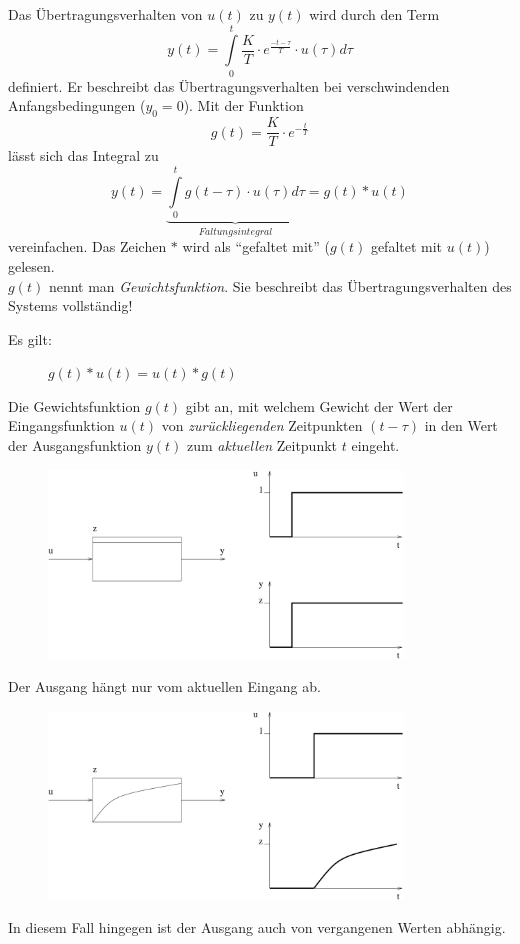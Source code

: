 \message{ !name(Mitschrieb_SysRegel.tex)}\documentclass[12pt,a4paper,ngerman]{scrartcl}
\begin{document}
Das Übertragungsverhalten von $u(t)$ zu $y(t)$ wird durch den Term
\begin{equation*}
  y(t)=\int\limits_0^t{\frac{K}{T}\cdot e^{\frac{-t-\tau}{T}}\cdot u(\tau)d\tau}
\end{equation*}
definiert. Er beschreibt das Übertragungsverhalten bei verschwindenden Anfangsbedingungen ($y_0=0$). Mit der Funktion
\begin{equation*}
  g(t)=\frac{K}{T}\cdot e^{-\frac{t}{T}}
\end{equation*}
lässt sich das Integral zu
\begin{equation*}
  y(t)=\underbrace{\int\limits_0^t{g(t-\tau)\cdot u(\tau)d\tau}}_{Faltungsintegral}=g(t)*u(t)
\end{equation*}
vereinfachen. Das Zeichen $*$ wird als ``gefaltet mit'' ($g(t)$ gefaltet mit $u(t)$) gelesen. \\
$g(t)$ nennt man \emph{Gewichtsfunktion}. Sie beschreibt das Übertragungsverhalten des Systems vollständig!

\begin{description}
\item[Es gilt:] $g(t)*u(t)=u(t)*g(t)$
\end{description}
Die Gewichtsfunktion $g(t)$ gibt an, mit welchem Gewicht der Wert der Eingangsfunktion $u(t)$ von \emph{zurückliegenden} Zeitpunkten $(t-\tau)$ in den Wert der Ausgangsfunktion $y(t)$ zum \emph{aktuellen} Zeitpunkt $t$ eingeht.\\
\begin{figure}[H]
  \centering
  \includegraphics[height=5cm]{sysregel_gewfkt_1}
\end{figure}
Der Ausgang hängt nur vom aktuellen Eingang ab.
\begin{figure}[H]
  \centering
  \includegraphics[height=5cm]{sysregel_gewfkt_2}
\end{figure}
In diesem Fall hingegen ist der Ausgang auch von vergangenen Werten abhängig.
\end{document}
